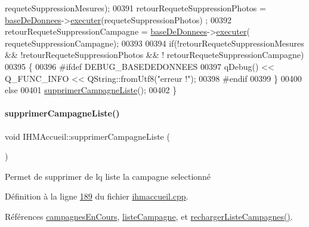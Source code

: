 \begin{DoxyCode}
      requeteSuppressionMesures);
00391     retourRequeteSuppressionPhotos = \hyperlink{class_i_h_m_accueil_ab56d9846c071396a92f88272880e2c1f}{baseDeDonnees}->\hyperlink{class_base_de_donnees_aa8de5f8f8bb17edc43f5c0ee33712081}{executer}(requeteSuppressionPhotos)
      ;
00392     retourRequeteSuppressionCampagne = \hyperlink{class_i_h_m_accueil_ab56d9846c071396a92f88272880e2c1f}{baseDeDonnees}->\hyperlink{class_base_de_donnees_aa8de5f8f8bb17edc43f5c0ee33712081}{executer}(
      requeteSuppressionCampagne);
00393 
00394     \textcolor{keywordflow}{if}(!retourRequeteSuppressionMesures && !retourRequeteSuppressionPhotos && !
      retourRequeteSuppressionCampagne)
00395     \{
00396 \textcolor{preprocessor}{        #ifdef DEBUG\_BASEDEDONNEES}
00397             qDebug() << Q\_FUNC\_INFO << QString::fromUtf8(\textcolor{stringliteral}{"erreur !"});
00398 \textcolor{preprocessor}{        #endif}
00399     \}
00400     \textcolor{keywordflow}{else}
00401         \hyperlink{class_i_h_m_accueil_a36ce6ecca4e258562577bab1439e0a96}{supprimerCampagneListe}();
00402 \}
\end{DoxyCode}
\mbox{\label{class_i_h_m_accueil_a36ce6ecca4e258562577bab1439e0a96}} 
\paragraph{\texorpdfstring{supprimer\+Campagne\+Liste()}{supprimerCampagneListe()}}
{\footnotesize\ttfamily void I\+H\+M\+Accueil\+::supprimer\+Campagne\+Liste (\begin{DoxyParamCaption}{ }\end{DoxyParamCaption})\hspace{0.3cm}{\ttfamily [private]}}



Permet de supprimer de lq liste la campagne selectionné 



Définition à la ligne \hyperlink{ihmaccueil_8cpp_source_l00189}{189} du fichier \hyperlink{ihmaccueil_8cpp_source}{ihmaccueil.\+cpp}.



Références \hyperlink{ihmaccueil_8h_source_l00039}{campagnes\+En\+Cours}, \hyperlink{ihmaccueil_8h_source_l00037}{liste\+Campagne}, et \hyperlink{ihmaccueil_8cpp_source_l00092}{recharger\+Liste\+Campagnes()}.



